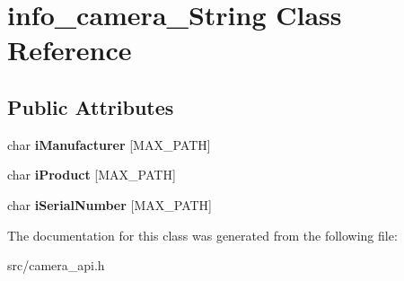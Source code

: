\hypertarget{classinfo__camera___string}{}\section{info\+\_\+camera\+\_\+\+String Class Reference}
\label{classinfo__camera___string}
\subsection*{Public Attributes}
\begin{DoxyCompactItemize}
\item 
\mbox{\label{classinfo__camera___string_a534901ae79a44cbd9e298e237fa4fc0f}} 
char {\bfseries i\+Manufacturer} \mbox{[}M\+A\+X\+\_\+\+P\+A\+TH\mbox{]}
\item 
\mbox{\label{classinfo__camera___string_a7760c615973f721307ccc15d291b82dd}} 
char {\bfseries i\+Product} \mbox{[}M\+A\+X\+\_\+\+P\+A\+TH\mbox{]}
\item 
\mbox{\label{classinfo__camera___string_aa36e331d9d8aa31382774bdd0a22f23e}} 
char {\bfseries i\+Serial\+Number} \mbox{[}M\+A\+X\+\_\+\+P\+A\+TH\mbox{]}
\end{DoxyCompactItemize}


The documentation for this class was generated from the following file\+:\begin{DoxyCompactItemize}
\item 
src/camera\+\_\+api.\+h\end{DoxyCompactItemize}
